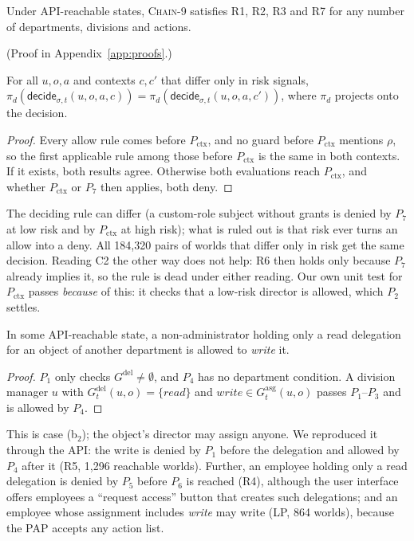 \documentclass[sigconf,review,anonymous]{acmart}
\newcommand{\chain}{\textsc{Chain-9}\xspace}
\newcommand{\Px}{P_{\mathrm{ctx}}}
\newcommand{\Gasg}{G^{\mathrm{asg}}}
\newcommand{\Gdel}{G^{\mathrm{del}}}
\newcommand{\decide}{\mathsf{decide}}
\begin{document}
\begin{theorem}\label{thm:pos}
Under API-reachable states, \chain satisfies R1, R2, R3 and R7 for any number of departments, divisions and actions.
\end{theorem}
(Proof in Appendix~\ref{app:proofs}.)

\begin{proposition}\label{prop:inert}
For all $u,o,a$ and contexts $c,c'$ that differ only in risk signals,
$\pi_d(\decide_{\sigma,t}(u,o,a,c))=\pi_d(\decide_{\sigma,t}(u,o,a,c'))$, where $\pi_d$ projects onto the decision.
\end{proposition}
\begin{proof}
Every allow rule comes before $\Px$, and no guard before $\Px$ mentions $\rho$, so the first applicable rule among
those before $\Px$ is the same in both contexts. If it exists, both results agree. Otherwise both evaluations reach
$\Px$, and whether $\Px$ or $P_7$ then applies, both deny.
\end{proof}
\noindent The deciding rule can differ (a custom-role subject without grants is denied by $P_7$ at low risk and by
$\Px$ at high risk); what is ruled out is that risk ever turns an allow into a deny. All 184{,}320 pairs of worlds that differ only in risk get the same decision. Reading C2 the other way does not
help: R6 then holds only because $P_7$ already implies it, so the rule is dead under either reading. Our own unit
test for $\Px$ passes \emph{because} of this: it checks that a low-risk director is allowed, which $P_2$ settles.

\begin{proposition}\label{prop:unlock}
In some API-reachable state, a non-administrator holding only a read delegation for an object of another
department is allowed to \emph{write} it.
\end{proposition}
\begin{proof}
$P_1$ only checks $\Gdel\neq\emptyset$, and $P_4$ has no department condition. A division manager $u$ with
$\Gdel_t(u,o)=\{\mathit{read}\}$ and $\mathit{write}\in\Gasg_t(u,o)$ passes $P_1$--$P_3$ and is allowed by $P_4$.
\end{proof}
\noindent This is case (b$_2$); the object's director may assign anyone. We reproduced it through the API: the write is denied by $P_1$ before the
delegation and allowed by $P_4$ after it (R5, 1{,}296 reachable worlds). Further, an employee holding only a read
delegation is denied by $P_5$ before $P_6$ is reached (R4), although the user interface offers employees a
``request access'' button that creates such delegations; and an employee whose assignment includes \emph{write} may
write (LP, 864 worlds), because the PAP accepts any action list.
\end{document}
